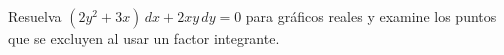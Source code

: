 Resuelva $(2y^2+3x)\,dx+2xy\,dy=0$ para gráficos reales y examine los puntos que se excluyen al usar un factor integrante.
